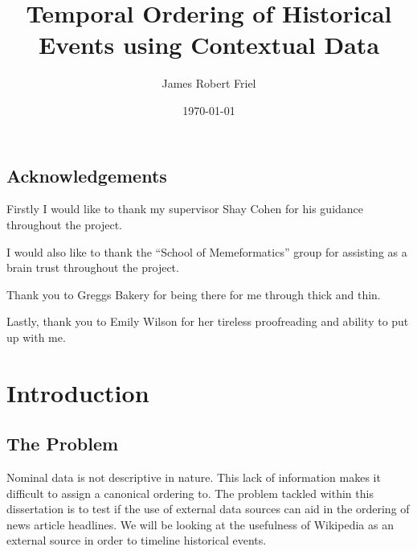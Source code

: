 \documentclass[bsc,frontabs,twoside,singlespacing,parskip,deptreport]{infthesis}     %
\begin{document}
\title{Temporal Ordering of Historical Events using Contextual Data}

\author{James Robert Friel}
 

\date{\today}

\abstract{}


\maketitle

\section*{Acknowledgements}
Firstly I would like to thank my supervisor Shay Cohen for his guidance throughout the project.

I would also like to thank the ``School of Memeformatics'' group for assisting as a brain trust
throughout the project.

Thank you to Greggs Bakery for being there for me through thick and thin.

Lastly, thank you to Emily Wilson for her tireless proofreading and ability to put up with me.

\tableofcontents



\chapter{Introduction}
\section{The Problem}
Nominal data is not descriptive in nature. This lack of information makes it difficult to assign
a canonical ordering to.
The problem tackled within this dissertation is to test if the use of external data sources can
aid in the ordering of news article headlines.
We will be looking at the usefulness of Wikipedia as an external source in order to timeline
historical events.
\end{document}
